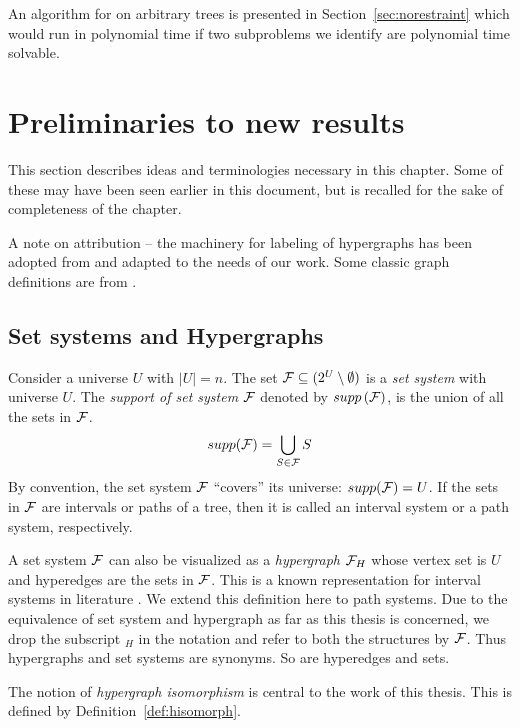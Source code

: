 
An algorithm for \CFTPL on arbitrary trees is presented in
Section~\ref{sec:norestraint} which would run in polynomial time if
two subproblems we identify are polynomial time solvable.

\section[Preliminaries]{Preliminaries to new results}
\label{ch:prelims}

This section describes ideas and terminologies necessary in this
chapter. Some of these may have been seen earlier in this document,
but is recalled for the sake of completeness of the chapter.  

A note on attribution -- the machinery for labeling of hypergraphs
has been adopted from \cite{kklv10} and adapted to the needs of our
work. Some classic graph definitions are from \cite{mcg04}.

\subsection{Set systems and Hypergraphs}
\label{sec:setsyshypergraph}

Consider a universe $U$ with $|U| = n$.  The set ${\mathcal F} \subseteq (2^{U}
\setminus \emptyset)$ is a {\em set system} with universe $U$.  The
{\em support of set system} ${\mathcal F}$ denoted by $supp\left({\cal F}\right)$, is the union
of all the sets in ${\mathcal F}$.
\[supp({\mathcal F}) = \bigcup_{S \in {\mathcal F}}S\]%
By convention, the set system ${\cal F}$ ``covers'' its universe:
$supp({\cal F}) = U$. If the sets in ${\cal F}$ are intervals or paths of a
tree, then it is called an interval system or a path system,
respectively.
\par
A set system ${\cal F}$ can also be visualized as a {\em hypergraph}
${\cal F}_H$ whose vertex set is $U$ and hyperedges are the sets in
${\cal F}$. This is a known representation for interval systems in
literature \cite{bls99,kklv10}.  We extend this definition here to
path systems. Due to the equivalence of set system and hypergraph as
far as this thesis is concerned, we drop the subscript $_H$ in the
notation and refer to both the structures by ${\cal F}$. Thus hypergraphs
and set systems are synonyms. So are hyperedges and sets.
\par
The notion of {\em hypergraph isomorphism} is central to the work of
this thesis. This is defined by Definition~\ref{def:hisomorph}.

